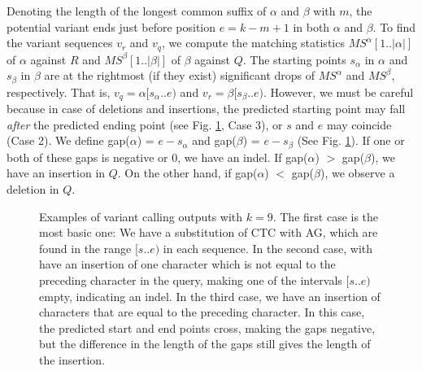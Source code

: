 \documentclass[unnumsec,webpdf,contemporary,large]{oup-authoring-template}%
\theoremstyle{thmstyleone}%
\theoremstyle{thmstyletwo}%
\theoremstyle{thmstylethree}%
\begin{document}
Denoting the length of the longest common suffix of $\alpha$ and $\beta$ with $m$, the potential variant ends just before position $e = k - m + 1$ in both $\alpha$ and $\beta$. To find the variant sequences $v_r$ and $v_q$, we compute the matching statistics $MS^\alpha[1..|\alpha|]$ of $\alpha$ against $R$ and $MS^\beta[1..|\beta|]$ of $\beta$ against $Q$. 
The starting points $s_\alpha$ in $\alpha$ and $s_\beta$ in $\beta$ are at the rightmost (if they exist) significant drops of $MS^\alpha$ and $MS^\beta$, respectively. That is, $v_q = \alpha[s_\alpha..e)$ and $v_r = \beta[s_\beta..e)$. However, we must be careful because in case of deletions and insertions, the predicted starting point may fall \emph{after} the predicted ending point (see Fig. \ref{fig:variantcall}, Case 3), or $s$ and $e$ may coincide (Case 2). We define gap($\alpha$) = $e - s_\alpha$ and gap($\beta$) = $e - s_\beta$ (See Fig. \ref{fig:variantcall}). 
If one or both of these gaps is negative or 0, we have an indel. If gap($\alpha$) $>$  gap($\beta$), we have an insertion in $Q$. On the other hand, if gap($\alpha$) $<$  gap($\beta$), we observe a deletion in $Q$.

\begin{figure}
    {}

\caption{Examples of variant calling outputs with $k=9$.
The first case is the most basic one: We have a substitution of CTC with AG, which are found in the range $[s..e)$ in each sequence. In the second case, with have an insertion of one character which is not equal to the preceding character in the query, making one of the intervals $[s..e)$ empty, indicating an indel. In the third case, we have an insertion of characters that are equal to the preceding character. In this case, the predicted start and end points cross, making the gaps negative, but the difference in the length of the gaps still gives the length of the insertion. }\label{fig:variantcall}
\end{figure}
\end{document}
